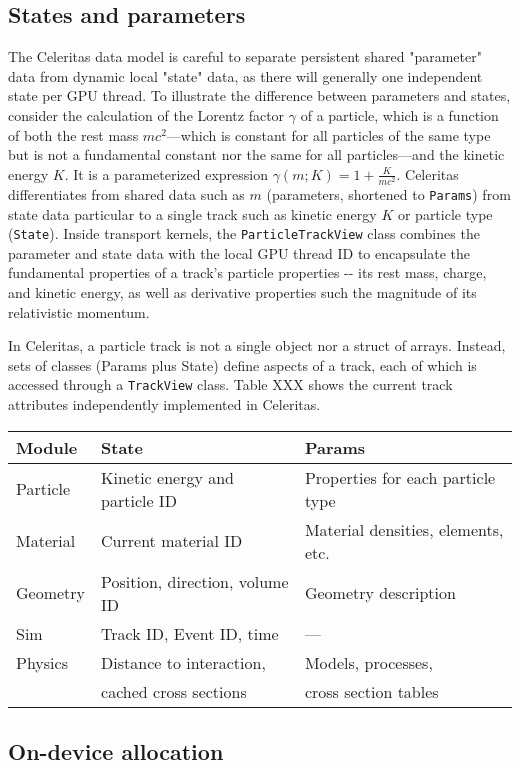 \hypertarget{states-and-parameters}{%
\subsection{States and parameters}\label{states-and-parameters}}

The Celeritas data model is careful to separate persistent shared
"parameter" data from dynamic local "state" data, as there will
generally one independent state per GPU thread. To illustrate the
difference between parameters and states, consider the calculation of
the Lorentz factor \(\gamma\) of a particle, which is a function of both
the rest mass \(mc^2\)---which is constant for all particles of the same
type but is not a fundamental constant nor the same for all
particles---and the kinetic energy \(K\). It is a parameterized
expression \(\gamma(m;K) = 1 + \frac{K}{mc^2}\). Celeritas
differentiates from shared data such as \(m\) (parameters, shortened to
\texttt{Params}) from state data particular to a single track such as
kinetic energy \(K\) or particle type (\texttt{State}). Inside transport
kernels, the \texttt{ParticleTrackView} class combines the parameter and
state data with the local GPU thread ID to encapsulate the fundamental
properties of a track's particle properties -\/- its rest mass, charge,
and kinetic energy, as well as derivative properties such the magnitude
of its relativistic momentum.

In Celeritas, a particle track is not a single object nor a struct of
arrays. Instead, sets of classes (Params plus State) define aspects of a
track, each of which is accessed through a \texttt{TrackView} class.
Table XXX shows the current track attributes independently implemented
in Celeritas.

\begin{longtable}[]{@{}lll@{}}
\toprule
Module & State & Params\tabularnewline
\midrule
\endhead
Particle & Kinetic energy and particle ID & Properties for each particle
type\tabularnewline
Material & Current material ID & Material densities, elements,
etc.\tabularnewline
Geometry & Position, direction, volume ID & Geometry
description\tabularnewline
Sim & Track ID, Event ID, time & ---\tabularnewline
Physics & Distance to interaction, & Models, processes,\tabularnewline
& cached cross sections & cross section tables\tabularnewline
\bottomrule
\end{longtable}

\hypertarget{on-device-allocation}{%
\subsection{On-device allocation}\label{on-device-allocation}}

